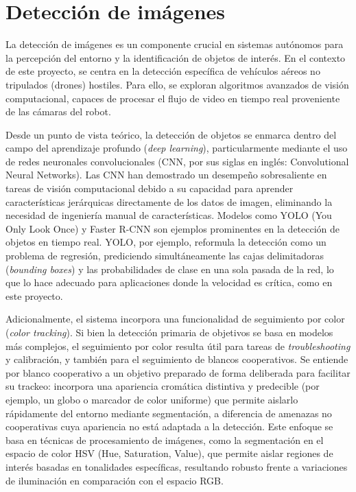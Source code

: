 
\section{Detección de imágenes}
La detección de imágenes es un componente crucial en sistemas autónomos para la percepción del entorno y la identificación de objetos de interés. En el contexto de este proyecto, se centra en la detección específica de vehículos aéreos no tripulados (drones) hostiles. Para ello, se exploran algoritmos avanzados de visión computacional, capaces de procesar el flujo de video en tiempo real proveniente de las cámaras del robot.

Desde un punto de vista teórico, la detección de objetos se enmarca dentro del campo del aprendizaje profundo (\textit{deep learning}), particularmente mediante el uso de redes neuronales convolucionales (CNN, por sus siglas en inglés: Convolutional Neural Networks). Las CNN han demostrado un desempeño sobresaliente en tareas de visión computacional debido a su capacidad para aprender características jerárquicas directamente de los datos de imagen, eliminando la necesidad de ingeniería manual de características. Modelos como YOLO (You Only Look Once) \citep{redmon2016yolo} y Faster R-CNN \citep{ren2015faster} son ejemplos prominentes en la detección de objetos en tiempo real. YOLO, por ejemplo, reformula la detección como un problema de regresión, prediciendo simultáneamente las cajas delimitadoras (\textit{bounding boxes}) y las probabilidades de clase en una sola pasada de la red, lo que lo hace adecuado para aplicaciones donde la velocidad es crítica, como en este proyecto.

Adicionalmente, el sistema incorpora una funcionalidad de seguimiento por color (\textit{color tracking}). Si bien la detección primaria de objetivos se basa en modelos más complejos, el seguimiento por color resulta útil para tareas de \textit{troubleshooting} y calibración, y también para el seguimiento de blancos cooperativos. Se entiende por blanco cooperativo a un objetivo preparado de forma deliberada para facilitar su trackeo: incorpora una apariencia cromática distintiva y predecible (por ejemplo, un globo o marcador de color uniforme) que permite aislarlo rápidamente del entorno mediante segmentación, a diferencia de amenazas no cooperativas cuya apariencia no está adaptada a la detección. Este enfoque se basa en técnicas de procesamiento de imágenes, como la segmentación en el espacio de color HSV (Hue, Saturation, Value), que permite aislar regiones de interés basadas en tonalidades específicas, resultando robusto frente a variaciones de iluminación en comparación con el espacio RGB.

